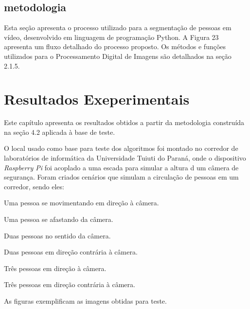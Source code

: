 \documentclass[12pt,oneside,a4paper,chapter=TITLE,section=TITLE,sumario=tradicional]{abntex2}
\begin{document}
\section{metodologia}
Esta seção apresenta o processo utilizado para a segmentação de pessoas em vídeo, desenvolvido em linguagem de programação Python. A Figura 23 apresenta um fluxo detalhado do processo proposto. Os métodos e funções utilizados para o Processamento Digital de Imagens são detalhados na seção 2.1.5.

\begin{figure}[htb]
\end{figure}
\chapter{Resultados Exeperimentais}
\label{cap:resultados}

Este capítulo apresenta os resultados obtidos a partir da metodologia construída na seção 4.2 aplicada à base de teste.

O local usado como base para teste dos algoritmos foi montado no corredor de laboratórios de informática da Universidade Tuiuti do Paraná, onde o dispositivo \textit{Raspberry Pi} foi acoplado a uma escada para simular a altura d um câmera de segurança.
Foram criados cenários que simulam a circulação de pessoas em um corredor, sendo eles:

\begin{lista}
    \item Uma pessoa se movimentando em direção à câmera.
    \item Uma pessoa se afastando da câmera.
    \item Duas pessoas no sentido da câmera.
    \item Duas pessoas em direção contrária à câmera.
    \item Três pessoas em direção à câmera.
    \item Três pessoas em direção contrária à câmera.
\end{lista}

As figuras exemplificam as imagens obtidas para teste.
\end{document}
